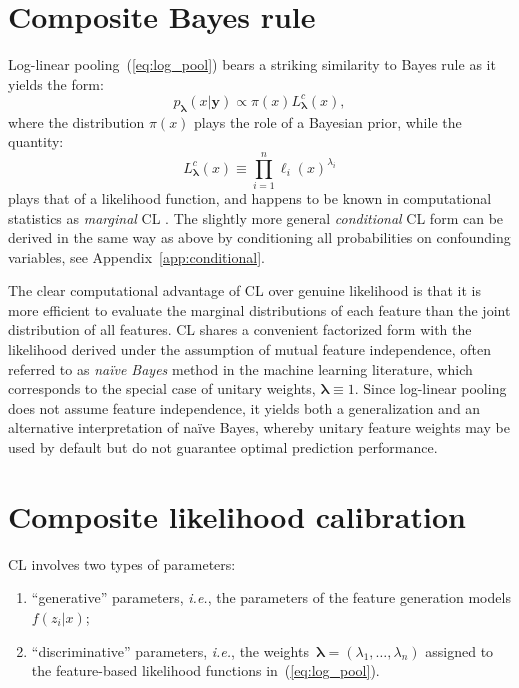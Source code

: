 \documentclass[english]{scrartcl}
\def\y{{\mathbf{y}}}
\newcommand{\blambda}{{\boldsymbol{\lambda}}}
\begin{document}
\section{Composite Bayes rule}
\label{sec:bayes_rule}

Log-linear pooling~(\ref{eq:log_pool}) bears a striking similarity to Bayes rule as it yields the form: 
$$
p_\blambda(x|\y)\propto \pi(x) L^c_\blambda(x),
$$
where the distribution $\pi(x)$ plays the role of a Bayesian prior, while the quantity:
\begin{equation}
\label{eq:comp_lik}
L^c_\blambda(x) \equiv \prod_{i=1}^n \ell_i (x)^{\lambda_i}
\end{equation} 
plays that of a likelihood function, and happens to be known in computational statistics as {\em marginal} CL \cite{Varin-11}. The slightly more general {\em conditional} CL form can be derived in the same way as above by conditioning all probabilities on confounding variables, see Appendix~\ref{app:conditional}. 

The clear computational advantage of CL over genuine likelihood is that it is more efficient to evaluate the marginal distributions of each feature than the joint distribution of all features. CL shares a convenient factorized form with the likelihood derived under the assumption of mutual feature independence, often referred to as {\em na\"ive Bayes} method in the machine learning literature, which corresponds to the special case of unitary weights, $\blambda\equiv 1$. Since log-linear pooling does not assume feature independence, it yields both a generalization and an alternative interpretation of na\"ive Bayes, whereby unitary feature weights may be used by default but do not guarantee optimal prediction performance.


\section{Composite likelihood calibration}
\label{sec:calibration}

CL involves two types of parameters:
\begin{enumerate}
    \item ``generative'' parameters, {\em i.e.}, the parameters of the feature generation models $f(z_i|x)$; 
    \item ``discriminative'' parameters, {\em i.e.},  the weights~$\blambda=(\lambda_1,\ldots,\lambda_n)$ assigned to the feature-based likelihood functions in~(\ref{eq:log_pool}).
\end{enumerate}
\end{document}
